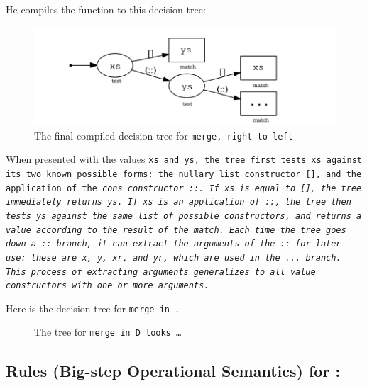 \documentclass[manuscript,screen,review, 12pt, nonacm]{acmart}
\begin{document}
    He compiles the function to this decision tree: 

    \begin{figure}[H]
        \includegraphics[scale=0.7]{../tex/images/dtree.png}
        \caption{The final compiled decision tree for \tt{merge}, right-to-left}
    \end{figure}

    When presented with the values \tt{xs} and \tt{ys}, the tree first tests
    \tt{xs} against its two known possible forms: the nullary list constructor
    \tt{[]}, and the application of the \it{cons} constructor \tt{::}. If
    \tt{xs} is equal to \tt{[]}, the tree immediately returns \tt{ys}. If
    \tt{xs} is an application of \tt{::}, the tree then tests \tt{ys} against
    the same list of possible constructors, and returns a value according to the
    result of the match. Each time the tree goes down a \tt{::} branch, it can
    extract the arguments of the \tt{::} for later use: these are \tt{x},
    \tt{y}, \tt{xr}, and \tt{yr}, which are used in the \tt{...} branch. This
    process of extracting arguments generalizes to all value constructors with
    one or more arguments. 

    Here is the decision tree for \tt{merge} in \D. 

    \begin{figure}[H]
        \caption{The tree for \tt{merge} in D looks \dots {}}
    \end{figure}


    \subsection{Rules (Big-step Operational Semantics) for \D:}
    
\end{document}
